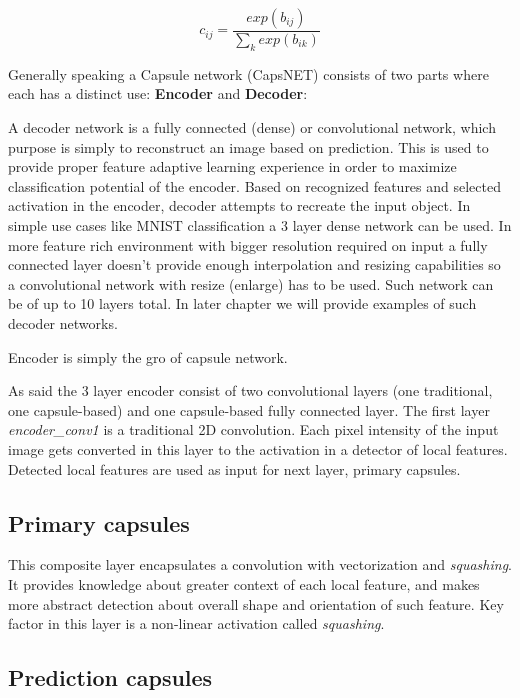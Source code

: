 \begin{equation}
    c_{ij} = \frac{exp(b_{ij})}{\sum_{k}exp(b_{ik})}
    \label{eq:softmax}
\end{equation}



Generally speaking a Capsule network (CapsNET) consists of two parts where each has a distinct use: \textbf{Encoder} and \textbf{Decoder}:

A decoder network is a fully connected (dense) or convolutional network, which purpose is simply to reconstruct an image based on prediction. This is used to provide proper feature adaptive learning experience in order to maximize classification potential of the encoder. Based on recognized features and selected activation in the encoder, decoder attempts to recreate the input object. In simple use cases like MNIST classification a 3 layer dense network can be used. In more feature rich environment with bigger resolution required on input a fully connected layer doesn't provide enough interpolation and resizing capabilities so a convolutional network with resize (enlarge) has to be used. Such network can be of up to 10 layers total. In later chapter we will provide examples of such decoder networks.

Encoder is simply the gro of capsule network.

As said the 3 layer encoder consist of two convolutional layers (one traditional, one capsule-based) and one capsule-based fully connected layer. The first layer
\textit{encoder\_conv1} is a traditional 2D convolution. Each pixel intensity of the input image gets converted in this layer to the activation in a detector of local features. Detected local features are used as input for next layer, primary capsules.

\subsection{Primary capsules}

This composite layer encapsulates a convolution with vectorization and \textit{squashing}. It provides knowledge about greater context of each local feature, and makes more abstract detection about overall shape and orientation of such feature. Key factor in this layer is a non-linear activation called \textit{squashing}.


\subsection{Prediction capsules}

